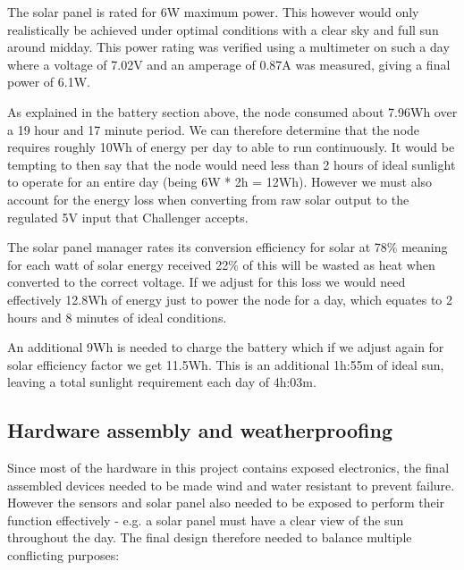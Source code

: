 The solar panel is rated for 6W maximum power. This however would only
realistically be achieved under optimal conditions with a clear sky and full sun
around midday. This power rating was verified using a multimeter on such a day
where a voltage of 7.02V and an amperage of 0.87A was measured, giving a final
power of 6.1W.

As explained in the battery section above, the node consumed about 7.96Wh over a
19 hour and 17 minute period. We can therefore determine that the node requires
roughly 10Wh of energy per day to able to run continuously. It would be tempting
to then say that the node would need less than 2 hours of ideal sunlight to
operate for an entire day (being 6W * 2h = 12Wh). However we must also account
for the energy loss when converting from raw solar output to the regulated 5V
input that Challenger accepts.

The solar panel manager rates its conversion efficiency for solar at 78\%
meaning for each watt of solar energy received 22\% of this will be wasted as
heat when converted to the correct voltage. If we adjust for this loss we would
need effectively 12.8Wh of energy just to power the node for a day, which
equates to 2 hours and 8 minutes of ideal conditions.

An additional 9Wh is needed to charge the battery which if we adjust again for
solar efficiency factor we get 11.5Wh. This is an additional 1h:55m of ideal
sun, leaving a total sunlight requirement each day of 4h:03m.

\subsection{Hardware assembly and weatherproofing}

Since most of the hardware in this project contains exposed electronics, the
final assembled devices needed to be made wind and water resistant to prevent
failure. However the sensors and solar panel also needed to be exposed to
perform their function effectively - e.g. a solar panel must have a clear view
of the sun throughout the day. The final design therefore needed to balance
multiple conflicting purposes:

